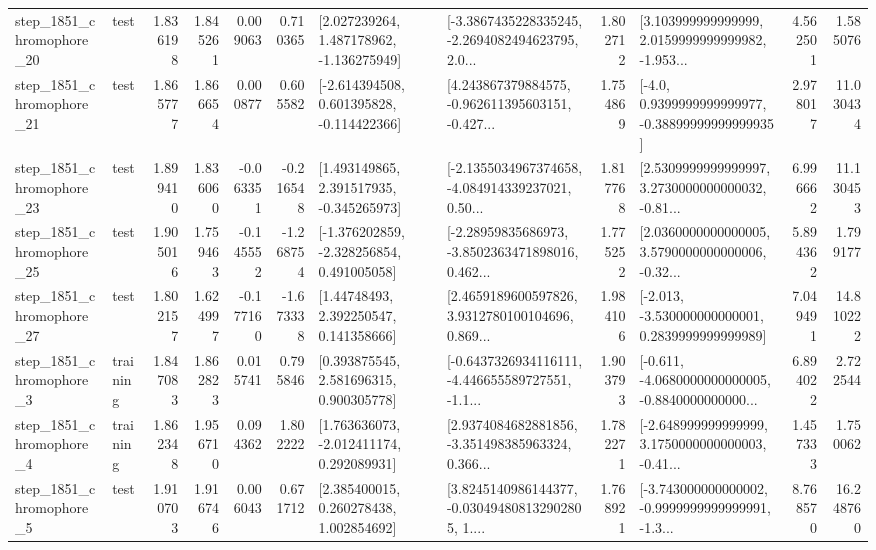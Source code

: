 \begin{tabular}{llrrrrllrlrr}
 step\_1851\_chromophore\_20 &      test &      1.836198 &    1.845261 &      0.009063 &  0.710365 &    [2.027239264, 1.487178962, -1.136275949] &  [-3.3867435228335245, -2.2694082494623795, 2.0... &       1.802712 &  [3.103999999999999, 2.0159999999999982, -1.953... &            4.562501 &          1.585076 \\
 step\_1851\_chromophore\_21 &      test &      1.865777 &    1.866654 &      0.000877 &  0.605582 &   [-2.614394508, 0.601395828, -0.114422366] &  [4.243867379884575, -0.962611395603151, -0.427... &       1.754869 &   [-4.0, 0.9399999999999977, -0.38899999999999935] &            2.978017 &         11.030434 \\
 step\_1851\_chromophore\_23 &      test &      1.899410 &    1.836060 &     -0.063351 & -0.216548 &    [1.493149865, 2.391517935, -0.345265973] &  [-2.1355034967374658, -4.084914339237021, 0.50... &       1.817768 &  [2.5309999999999997, 3.2730000000000032, -0.81... &            6.996662 &         11.130453 \\
 step\_1851\_chromophore\_25 &      test &      1.905016 &    1.759463 &     -0.145552 & -1.268754 &   [-1.376202859, -2.328256854, 0.491005058] &  [-2.28959835686973, -3.8502363471898016, 0.462... &       1.775252 &  [2.0360000000000005, 3.5790000000000006, -0.32... &            5.894362 &          1.799177 \\
 step\_1851\_chromophore\_27 &      test &      1.802157 &    1.624997 &     -0.177160 & -1.673338 &      [1.44748493, 2.392250547, 0.141358666] &  [2.4659189600597826, 3.9312780100104696, 0.869... &       1.984106 &   [-2.013, -3.530000000000001, 0.2839999999999989] &            7.049491 &         14.810222 \\
  step\_1851\_chromophore\_3 &  training &      1.847083 &    1.862823 &      0.015741 &  0.795846 &     [0.393875545, 2.581696315, 0.900305778] &  [-0.6437326934116111, -4.446655589727551, -1.1... &       1.903793 &  [-0.611, -4.0680000000000005, -0.8840000000000... &            6.894022 &          2.722544 \\
  step\_1851\_chromophore\_4 &  training &      1.862348 &    1.956710 &      0.094362 &  1.802222 &    [1.763636073, -2.012411174, 0.292089931] &  [2.9374084682881856, -3.351498385963324, 0.366... &       1.782271 &  [-2.648999999999999, 3.1750000000000003, -0.41... &            1.457333 &          1.750062 \\
  step\_1851\_chromophore\_5 &      test &      1.910703 &    1.916746 &      0.006043 &  0.671712 &     [2.385400015, 0.260278438, 1.002854692] &  [3.8245140986144377, -0.030494808132902805, 1.... &       1.768921 &  [-3.743000000000002, -0.9999999999999991, -1.3... &            8.768570 &         16.248760 \\

\end{tabular}
